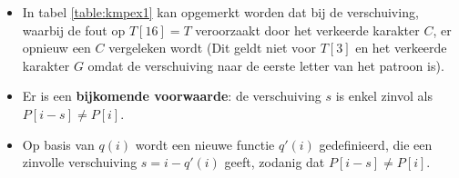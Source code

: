 \begin{itemize}
\begin{itemize}
        \begin{table}[ht]
            \centering   
            \caption{Een eerste versie van het Knuth-Morris-Prattalgoritme, waarbij $s = i - q(i)$.}
            \label{table:kmpex1}
        \end{table}

    \end{itemize}
    \item In tabel \ref{table:kmpex1} kan opgemerkt worden dat bij de verschuiving, waarbij de fout op $T[16] = T$ veroorzaakt door het verkeerde karakter $C$, er opnieuw een $C$ vergeleken wordt (Dit geldt niet voor $T[3]$ en het verkeerde karakter $G$ omdat de verschuiving naar de eerste letter van het patroon is). 
    \item Er is een \textbf{bijkomende voorwaarde}: de verschuiving $s$ is enkel zinvol als $P[i - s] \neq P[i]$.
    \item Op basis van $q(i)$ wordt een nieuwe functie $q'(i)$ gedefinieerd, die een zinvolle verschuiving $s = i - q'(i)$ geeft, zodanig dat $P[i - s] \neq P[i]$.


\end{itemize}
